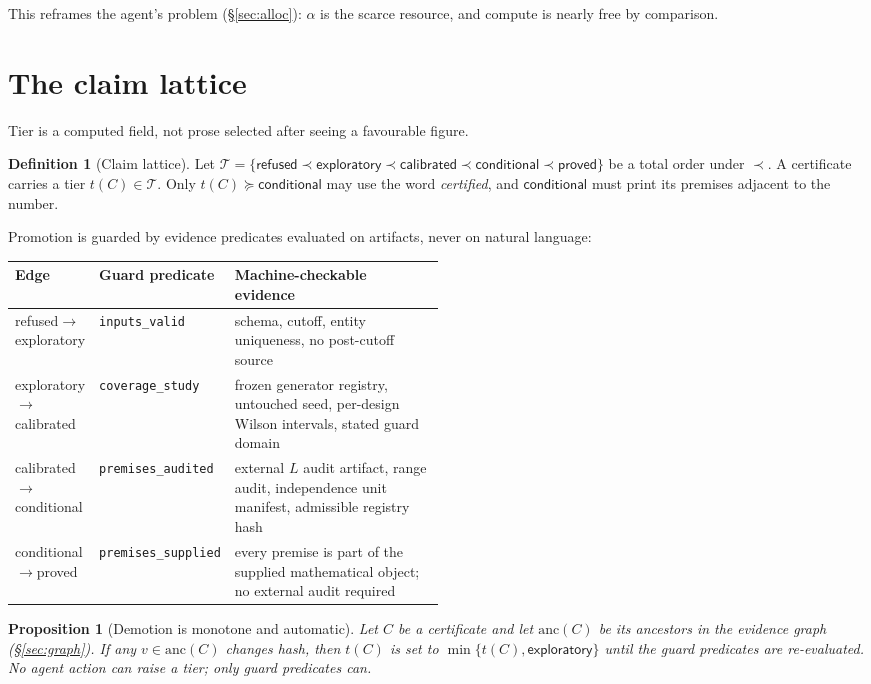 \documentclass[11pt,a4paper]{article}
\newtheorem{proposition}[theorem]{Proposition}
\theoremstyle{definition}
\newtheorem{definition}[theorem]{Definition}
\theoremstyle{remark}
\newcommand{\code}[1]{\texttt{\small#1}}
\newcommand{\tier}[1]{\textsf{#1}}
\begin{document}
This reframes the agent's problem (\S\ref{sec:alloc}): $\alpha$ is the scarce resource, and compute is nearly free by comparison.

\section{The claim lattice}\label{sec:tiers}

Tier is a computed field, not prose selected after seeing a favourable figure.

\begin{definition}[Claim lattice]\label{def:lattice}
Let $\mathcal{T}=\{\tier{refused}\prec\tier{exploratory}\prec\tier{calibrated}\prec\tier{conditional}\prec\tier{proved}\}$ be a total order under $\prec$. A certificate carries a tier $t(C)\in\mathcal{T}$. Only $t(C)\succeq\tier{conditional}$ may use the word \emph{certified}, and $\tier{conditional}$ must print its premises adjacent to the number.
\end{definition}

Promotion is guarded by evidence predicates evaluated on artifacts, never on natural language:

\begin{center}
\small
\begin{tabular}{@{}llp{0.5\linewidth}@{}}
\toprule
Edge & Guard predicate & Machine-checkable evidence \\
\midrule
\tier{refused}$\to$\tier{exploratory} & \code{inputs\_valid} & schema, cutoff, entity uniqueness, no post-cutoff source \\
\tier{exploratory}$\to$\tier{calibrated} & \code{coverage\_study} & frozen generator registry, untouched seed, per-design Wilson intervals, stated guard domain \\
\tier{calibrated}$\to$\tier{conditional} & \code{premises\_audited} & external $L$ audit artifact, range audit, independence unit manifest, admissible registry hash \\
\tier{conditional}$\to$\tier{proved} & \code{premises\_supplied} & every premise is part of the supplied mathematical object; no external audit required \\
\bottomrule
\end{tabular}
\end{center}

\begin{proposition}[Demotion is monotone and automatic]\label{prop:demote}
Let $C$ be a certificate and let $\mathrm{anc}(C)$ be its ancestors in the evidence graph (\S\ref{sec:graph}). If any $v\in\mathrm{anc}(C)$ changes hash, then $t(C)$ is set to $\min\{t(C),\tier{exploratory}\}$ until the guard predicates are re-evaluated. No agent action can raise a tier; only guard predicates can.
\end{proposition}
\end{document}
